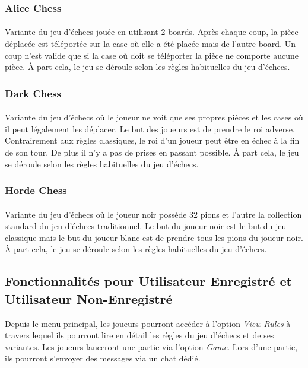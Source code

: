 \documentclass[10pt, a4paper]{article}
\begin{document}
				\subsubsection{Alice Chess}
					\paragraph{}Variante du jeu d'échecs jouée en utilisant 2 boards. Après chaque coup, la pièce déplacée est téléportée sur la case où elle a été placée mais de l'autre board. Un coup n'est valide que si la case où doit se téléporter la pièce ne comporte aucune pièce. À part cela, le jeu se déroule selon les règles habituelles du jeu d'échecs.
				\subsubsection{Dark Chess}
					\paragraph{}Variante du jeu d'échecs où le joueur ne voit que ses propres pièces et les cases où il peut légalement les déplacer. Le but des joueurs est de prendre le roi adverse. Contrairement aux règles classiques, le roi d'un joueur peut être en échec à la fin de son tour. De plus il n'y a pas de prises en passant possible. À part cela, le jeu se déroule selon les règles habituelles du jeu d'échecs.
				\subsubsection{Horde Chess}
					\paragraph{} Variante du jeu d'échecs où le joueur noir possède 32 pions et l'autre la collection standard du jeu d'échecs traditionnel. Le but du joueur noir est le but du jeu classique mais le but du joueur blanc est de prendre tous les pions du joueur noir. À part cela, le jeu se déroule selon les règles habituelles du jeu d'échecs.

			\subsection{Fonctionnalités pour Utilisateur Enregistré et Utilisateur Non-Enregistré}Depuis le menu principal, les joueurs pourront accéder à l'option {\itshape View Rules} à travers lequel ils pourront lire en détail les règles du jeu d'échecs et de ses variantes. Les joueurs lanceront une partie via l'option {\itshape Game}. Lors d'une partie, ils pourront s'envoyer des messages via un chat dédié.
\end{document}

